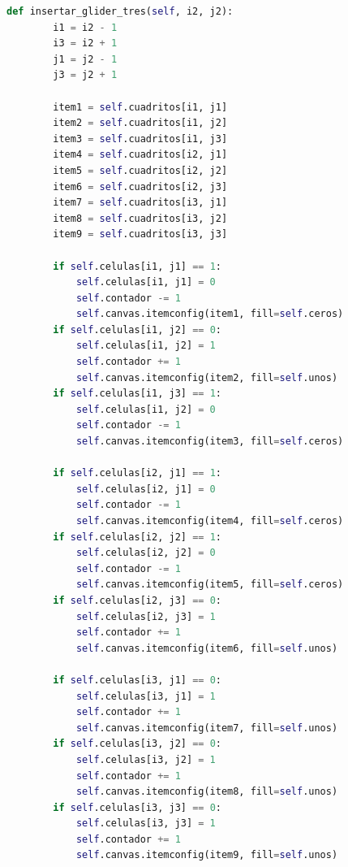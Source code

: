 \begin{lstlisting}[language=Python]
    def insertar_glider_tres(self, i2, j2):
        i1 = i2 - 1
        i3 = i2 + 1
        j1 = j2 - 1
        j3 = j2 + 1

        item1 = self.cuadritos[i1, j1]
        item2 = self.cuadritos[i1, j2]
        item3 = self.cuadritos[i1, j3]
        item4 = self.cuadritos[i2, j1]
        item5 = self.cuadritos[i2, j2]
        item6 = self.cuadritos[i2, j3]
        item7 = self.cuadritos[i3, j1]
        item8 = self.cuadritos[i3, j2]
        item9 = self.cuadritos[i3, j3]

        if self.celulas[i1, j1] == 1:
            self.celulas[i1, j1] = 0
            self.contador -= 1
            self.canvas.itemconfig(item1, fill=self.ceros)
        if self.celulas[i1, j2] == 0:
            self.celulas[i1, j2] = 1
            self.contador += 1
            self.canvas.itemconfig(item2, fill=self.unos)
        if self.celulas[i1, j3] == 1:
            self.celulas[i1, j2] = 0
            self.contador -= 1
            self.canvas.itemconfig(item3, fill=self.ceros)

        if self.celulas[i2, j1] == 1:
            self.celulas[i2, j1] = 0
            self.contador -= 1
            self.canvas.itemconfig(item4, fill=self.ceros)
        if self.celulas[i2, j2] == 1:
            self.celulas[i2, j2] = 0
            self.contador -= 1
            self.canvas.itemconfig(item5, fill=self.ceros)
        if self.celulas[i2, j3] == 0:
            self.celulas[i2, j3] = 1
            self.contador += 1
            self.canvas.itemconfig(item6, fill=self.unos)

        if self.celulas[i3, j1] == 0:
            self.celulas[i3, j1] = 1
            self.contador += 1
            self.canvas.itemconfig(item7, fill=self.unos)
        if self.celulas[i3, j2] == 0:
            self.celulas[i3, j2] = 1
            self.contador += 1
            self.canvas.itemconfig(item8, fill=self.unos)
        if self.celulas[i3, j3] == 0:
            self.celulas[i3, j3] = 1
            self.contador += 1
            self.canvas.itemconfig(item9, fill=self.unos)


\end{lstlisting}
